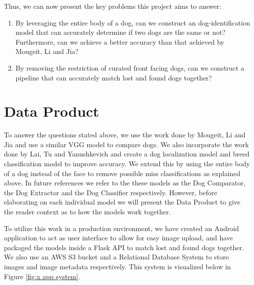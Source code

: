 \documentclass{article}
\begin{document}
Thus, we can now present the key problems this project aims to answer:

\begin{enumerate}
  \item By leveraging the entire body of a dog, can we construct an dog-identification model that can accurately determine if two dogs are the same or not?  Furthermore, can we achieve a better accuracy than that achieved by Mougeit, Li and Jia?
  \item By removing the restriction of curated front facing dogs, can we construct a pipeline that can accurately match lost and found dogs together? 
\end{enumerate}

\section{Data Product}

	To answer the questions stated above, we use the work done by Mougeit, Li and Jia and use a similar VGG model to compare dogs.  We also incorporate the work done by Lai, Tu and Yanushkevich and create a dog localization model and breed classification model to improve accuracy.   We extend this by using the entire body of a dog instead of the face to remove possible miss classifications as explained above.  In future references we refer to the these models as the Dog Comparator, the Dog Extractor and the Dog Classifier respectively.  However, before elaborating on each individual model we will present the Data Product to give the reader context as to how the models work together.

	To utilize this work in a production environment, we have created an Android application to act as user interface to allow for easy image upload, and have packaged the models inside a Flask API to match lost and found dogs together. We also use an AWS S3 bucket and a Relational Database System to store images and image metadata respectively.  This system is visualized below in Figure \ref{fig:x app system}.
\end{document}
